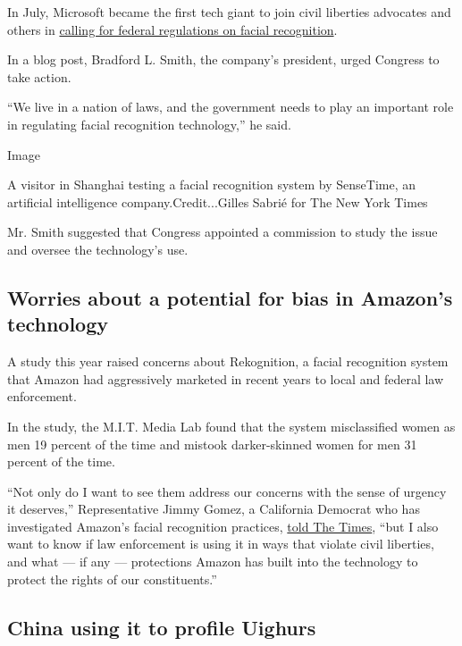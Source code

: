 In July, Microsoft became the first tech giant to join civil liberties
advocates and others in
\href{https://www.nytimes3xbfgragh.onion/2018/07/13/technology/microsoft-facial-recognition.html}{calling
for federal regulations on facial recognition}.

In a blog post, Bradford L. Smith, the company's president, urged
Congress to take action.

``We live in a nation of laws, and the government needs to play an
important role in regulating facial recognition technology,'' he said.

Image

A visitor in Shanghai testing a facial recognition system by SenseTime,
an artificial intelligence company.Credit...Gilles Sabrié for The New
York Times

Mr. Smith suggested that Congress appointed a commission to study the
issue and oversee the technology's use.

\hypertarget{worries-about-a-potential-for-bias-in-amazons-technology}{%
\subsection{Worries about a potential for bias in Amazon's
technology}\label{worries-about-a-potential-for-bias-in-amazons-technology}}

A study this year raised concerns about Rekognition, a facial
recognition system that Amazon had aggressively marketed in recent years
to local and federal law enforcement.

In the study, the M.I.T. Media Lab found that the system misclassified
women as men 19 percent of the time and mistook darker-skinned women for
men 31 percent of the time.

``Not only do I want to see them address our concerns with the sense of
urgency it deserves,'' Representative Jimmy Gomez, a California Democrat
who has investigated Amazon's facial recognition practices,
\href{https://www.nytimes3xbfgragh.onion/2019/01/24/technology/amazon-facial-technology-study.html}{told
The Times}, ``but I also want to know if law enforcement is using it in
ways that violate civil liberties, and what --- if any --- protections
Amazon has built into the technology to protect the rights of our
constituents.''

\hypertarget{china-using-it-to-profile-uighurs}{%
\subsection{China using it to profile
Uighurs}\label{china-using-it-to-profile-uighurs}}

